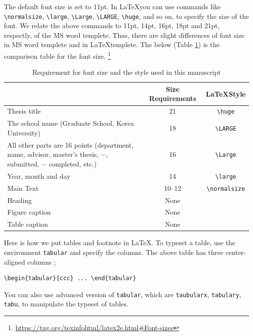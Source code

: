 \documentclass[11pt]{report}
\theoremstyle{plain}
\theoremstyle{definition}
\theoremstyle{corollary}
\theoremstyle{definition}
\theoremstyle{plain}
\theoremstyle{definition}
\theoremstyle{plain}
\begin{document}
The default font size is set to 11pt.
In \LaTeX you can use commands like \verb|\normalsize|, \verb|\large|, \verb|\Large|, \verb|\LARGE|, \verb|\huge|, and so on, to specify the size of the font.
We relate the above commands to 11pt, 14pt, 16pt, 18pt and 21pt, respectly, of the MS word templete.
Thus, there are slight differences of font size in MS word templete and in \LaTeX templete.
The below (Table \ref{tab:font size}) is the comparison table for the font size.
\footnote{\url{https://tug.org/texinfohtml/latex2e.html#Font-sizes}}
\begin{table}[h]\centering
\begin{tabular}{>{\centering\arraybackslash}p{6cm}cc}
\hline
&Size Requirements&\LaTeX Style\\\hline
Thesis title			&21&\verb|\huge|\\\hline
The school name (Graduate School, Korea University)
					&18&\verb|\LARGE|\\\hline
All other parts are 16 points (department, name, advisor, master's thesis, \(\cdots\), submitted, \(\cdots\) completed, etc.)	
					&16&\verb|\Large|\\\hline
Year, month and day	&14&\verb|\large|\\\hline
Main Text			&10--12&\verb|\normalsize|\\\hline
Heading				&None&\\\hline
Figure caption			&None&\\\hline
Table caption			&None&\\\hline
\end{tabular}
\caption{Requirement for font size and the style used in this manuscript}\label{tab:font size}
\end{table}


Here is how we put tables and footnote in \LaTeX.
To typeset a table, use the environment \texttt{tabular} and specify the columns.
The above table has three center-aligned columns ;
\begin{verbatim}
\begin{tabular}{ccc} ... \end{tabular}
\end{verbatim}
You can also use advanced version of \texttt{tabular}, which are \texttt{taubularx}, \texttt{tabulary}, \texttt{tabu}, to manipulate the typeset of tables.
\end{document}
